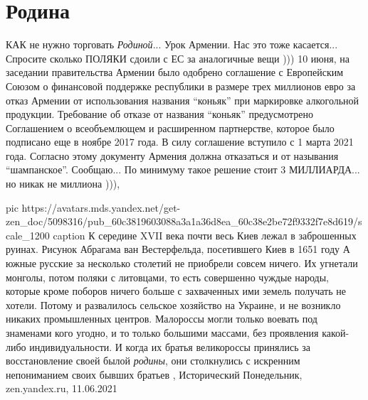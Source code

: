  
 
 
 
 
\chapter{Родина}

КАК не нужно торговать \emph{Родиной}...  Урок Армении. Нас это тоже
касается... Спросите сколько ПОЛЯКИ сдоили с ЕС за аналогичные вещи ))) 10
июня, на заседании правительства Армении было одобрено соглашение с Европейским
Союзом о финансовой поддержке республики в размере трех миллионов евро за отказ
Армении от использования названия \enquote{коньяк} при маркировке алкогольной
продукции.  Требование об отказе от названия \enquote{коньяк} предусмотрено Соглашением
о всеобъемлющем и расширенном партнерстве, которое было подписано еще в ноябре
2017 года. В силу соглашение вступило с 1 марта 2021 года.  Согласно этому
документу Армения должна отказаться и от называния \enquote{шампанское}.  Сообщаю... По
минимуму такое решение стоит 3 МИЛЛИАРДА... но никак не миллиона ))),

\ifcmt
	pic https://avatars.mds.yandex.net/get-zen_doc/5098316/pub_60c3819603088a3a1a36d8ea_60c38e2be72f9332f7e8d619/scale_1200
  caption К середине XVII века почти весь Киев лежал в заброшенных руинах. Рисунок Абрагама ван Вестерфельда, посетившего Киев в 1651 году
\fi
А южные русские за несколько столетий не приобрели совсем ничего. Их угнетали
монголы, потом поляки с литовцами, то есть совершенно чуждые народы, которые
кроме поборов ничего больше с захваченных ими земель получать не хотели. Потому
и развалилось сельское хозяйство на Украине, и не возникло никаких промышленных
центров. Малороссы могли только воевать под знаменами кого угодно, и то только
большими массами, без проявления какой-либо индивидуальности. И когда их братья
великороссы принялись за восстановление своей былой \emph{родины}, они столкнулись с
искренним непониманием своих бывших братьев
, 
Исторический Понедельник, zen.yandex.ru, 11.06.2021

